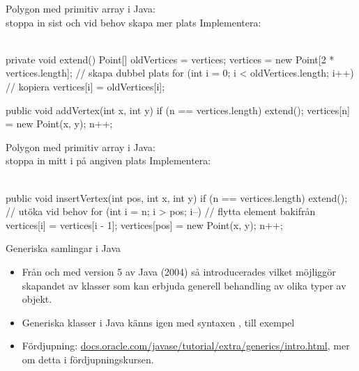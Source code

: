 \begin{Slide}{Polygon med primitiv array i Java: \\stoppa in sist och vid behov skapa mer plats}\SlideFontSmall
Implementera:\\
\\
\pause
\begin{Code}[numberstyle=,numbers=left,language=Java]
    private void extend(){
        Point[] oldVertices = vertices;
        vertices = new Point[2 * vertices.length]; // skapa dubbel plats
        for (int i = 0; i < oldVertices.length; i++) {  // kopiera
            vertices[i] = oldVertices[i];
        }        
    }

    public void addVertex(int x, int y) {
        if (n == vertices.length) extend();
        vertices[n] = new Point(x, y);
        n++;
    }
\end{Code}
\end{Slide}


\begin{Slide}{Polygon med primitiv array i Java: \\stoppa in mitt i på angiven plats }\SlideFontSmall
Implementera:\\
\\
\pause
\begin{Code}[numberstyle=,numbers=left,language=Java]
    public void insertVertex(int pos, int x, int y) {
        if (n == vertices.length) extend();   // utöka vid behov
        for (int i = n; i > pos; i--) {       // flytta element bakifrån
            vertices[i] = vertices[i - 1];
        }
        vertices[pos] = new Point(x, y);
        n++;
    }
\end{Code}
\end{Slide}




\begin{Slide}{Generiska samlingar i Java}
\begin{itemize}
\item Från och med version 5 av Java (2004) så introducerades  vilket möjliggör skapandet av klasser som kan erbjuda generell behandling av olika typer av objekt. 

\item Generiska klasser i Java känns igen med syntaxen , till exempel    

\item Fördjupning: \href{https://docs.oracle.com/javase/tutorial/extra/generics/intro.html}{docs.oracle.com/javase/tutorial/extra/generics/intro.html}, mer om detta i fördjupningskursen.

\end{itemize}
\end{Slide}

